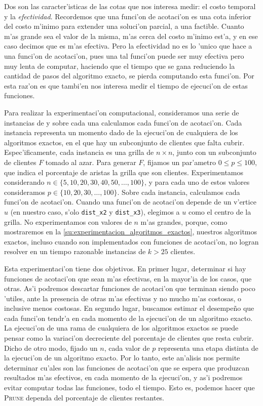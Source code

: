 Dos son las caracter'isticas de las cotas que nos interesa medir: el costo temporal y la \textit{efectividad}. Recordemos que una funci'on de acotaci'on es una cota inferior del costo m'inimo para extender una soluci'on parcial, a una factible. Cuanto m'as grande sea el valor de la misma, m'as cerca del costo m'inimo est'a, y en ese caso decimos que es m'as efectiva. Pero la efectividad no es lo 'unico que hace a una funci'on de acotaci'on, pues una tal funci'on puede ser muy efectiva pero muy lenta de computar, haciendo que el tiempo que se gana reduciendo la cantidad de pasos del algoritmo exacto, se pierda computando esta funci'on. Por esta raz'on es que tambi'en nos interesa medir el tiempo de ejecuci'on de estas funciones.

Para realizar la experimentaci'on computacional, consideramos una serie de instancias de  y sobre cada una calculamos cada funci'on de acotaci'on. Cada instancia representa un momento dado de la ejecuci'on de cualquiera de los algoritmos exactos, en el que hay un subconjunto de clientes que falta cubrir. Espec'ificamente, cada instancia es una grilla de $n \times n$, junto con un subconjunto de clientes $F$ tomado al azar. Para generar $F$, fijamos un par'ametro $0 \leq p \leq 100$, que indica el porcentaje de aristas la grilla que son clientes. Experimentamos considerando $n \in \{5, 10, 20, 30, 40, 50, \dots, 100\}$, y para cada uno de estos valores consideramos $p \in \{10, 20, 30, \dots, 100\}$. Sobre cada instancia, calculamos cada funci'on de acotaci'on. Cuando una funci'on de acotaci'on depende de un v'ertice $u$ (en nuestro caso, s'olo \texttt{dist\_x2} y \texttt{dist\_x3}), elegimos a $u$ como el centro de la grilla. No experimentamos con valores de $n$ m'as grandes, porque, como mostraremos en la \autoref{su:experimentacion_algoritmos_exactos}, nuestros algoritmos exactos, incluso cuando son implementados con funciones de acotaci'on, no logran resolver en un tiempo razonable instancias de $k > 25$ clientes.

Esta experimentaci'on tiene dos objetivos. En primer lugar, determinar si hay funciones de acotaci'on que sean m'as efectivas, en la mayor'ia de los casos, que otras. As'i podremos descartar funciones de acotaci'on que terminan siendo poco 'utiles, ante la presencia de otras m'as efectivas y no mucho m'as costosas, o inclusive menos costosas. En segundo lugar, buscamos estimar el desempe\~no que cada funci'on tendr'a en cada momento de la ejecuci'on de un algoritmo exacto. La ejecuci'on de una rama de cualquiera de los algoritmos exactos se puede pensar como la variaci'on decreciente del porcentaje de clientes que resta cubrir. Dicho de otro modo, fijado un $n$, cada valor de $p$ representa una etapa distinta de la ejecuci'on de un algoritmo exacto. Por lo tanto, este an'alisis nos permite determinar cu'ales son las funciones de acotaci'on que se espera que produzcan resultados m'as efectivos, en cada momento de la ejecuci'on, y as'i podremos evitar computar todas las funciones, todo el tiempo. Esto es, podemos hacer que \textsc{Prune} dependa del porcentaje de clientes restantes.

